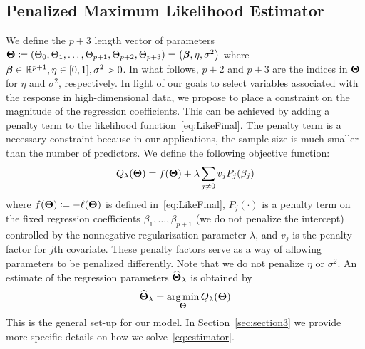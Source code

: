 


\subsection{Penalized Maximum Likelihood Estimator}
We define the $p+3$  length vector of parameters $\boldsymbol{\Theta} \coloneqq \left(\Theta_0, \Theta_1, \ldots, \Theta_{p+1}, \Theta_{p+2}, \Theta_{p+3}\right) =  \left(\boldsymbol{\beta}, \eta, \sigma^2 \right)$ where $\boldsymbol{\beta} \in \mathbb{R}^{p+1}, \eta \in [0,1], \sigma^2 >0$. In what follows, $p+2$ and $p+3$ are the indices in $\boldsymbol{\Theta}$ for $\eta$ and $\sigma^2$, respectively. In light of our goals to select variables associated with the response in high-dimensional data, we propose to place a constraint on the magnitude of the regression coefficients. This can be achieved by adding a penalty term to the likelihood function~\eqref{eq:LikeFinal}. The penalty term is a necessary constraint because in our applications, the sample size is much smaller than the number of predictors. We define the following objective function:
\begin{equation}
Q_{\lambda}(\boldsymbol{\Theta}) = f(\boldsymbol{\Theta}) + \lambda \sum_{j\neq 0} v_j P_j(\beta_j)
\end{equation}
where $f(\boldsymbol{\Theta})\coloneqq-\ell(\boldsymbol{\Theta})$ is defined in~\eqref{eq:LikeFinal}, $P_j(\cdot)$ is a penalty term on the fixed regression coefficients $\beta_1, \ldots, \beta_{p+1}$ (we do not penalize the intercept) controlled by the nonnegative regularization parameter $\lambda$, and $v_j$ is the penalty factor for $j$th covariate. These penalty factors serve as a way of allowing parameters to be penalized differently. Note that we do not penalize $\eta$ or $\sigma^2$. An estimate of the regression parameters $\widehat{\boldsymbol{\Theta}}_{\lambda}$ is obtained by
\begin{equation}
\widehat{\boldsymbol{\Theta}}_{\lambda} = \operatorname*{arg\,min}_{\boldsymbol{\Theta}} Q_{\lambda}(\boldsymbol{\Theta}) \label{eq:estimator}
\end{equation}
This is the general set-up for our model. In Section~\ref{sec:section3} we provide more specific details on how we solve~\eqref{eq:estimator}. 

